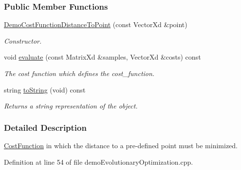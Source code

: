 \subsubsection*{Public Member Functions}
\begin{DoxyCompactItemize}
\item 
\hyperlink{classDmpBbo_1_1DemoCostFunctionDistanceToPoint_a6d89a9e9f151cbac696edf37087b9aa2}{Demo\+Cost\+Function\+Distance\+To\+Point} (const Vector\+Xd \&point)
\begin{DoxyCompactList}\small\item\em Constructor. \end{DoxyCompactList}\item 
void \hyperlink{classDmpBbo_1_1DemoCostFunctionDistanceToPoint_a52da51bc9ad0d5f5c8ddd8ca79235ac9}{evaluate} (const Matrix\+Xd \&samples, Vector\+Xd \&costs) const 
\begin{DoxyCompactList}\small\item\em The cost function which defines the cost\+\_\+function. \end{DoxyCompactList}\item 
string \hyperlink{classDmpBbo_1_1DemoCostFunctionDistanceToPoint_a1aca816b42cf0d36118be0ab91120d77}{to\+String} (void) const 
\begin{DoxyCompactList}\small\item\em Returns a string representation of the object. \end{DoxyCompactList}\end{DoxyCompactItemize}


\subsubsection{Detailed Description}
\hyperlink{classDmpBbo_1_1CostFunction}{Cost\+Function} in which the distance to a pre-\/defined point must be minimized. 

Definition at line 54 of file demo\+Evolutionary\+Optimization.\+cpp.



